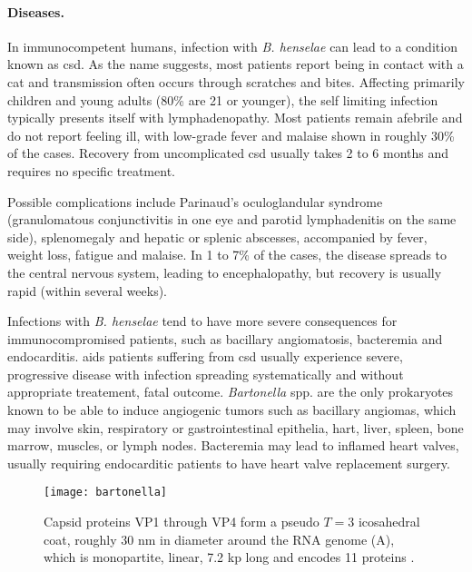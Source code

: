 \paragraph{Diseases.}
In immunocompetent humans, infection with \textit{B. henselae} can lead to a condition known as \gls{csd}. As the name suggests, most patients report being in contact with a cat and transmission often occurs through scratches and bites. Affecting primarily children and young adults (80\% are 21 or younger), the self limiting infection typically presents itself with lymphadenopathy. Most patients remain afebrile and do not report feeling ill, with low-grade fever and malaise shown in roughly 30\% of the cases. Recovery from uncomplicated \gls{csd} usually takes 2 to 6 months and requires no specific treatment.

Possible complications include Parinaud's oculoglandular syndrome (granulomatous conjunctivitis in one eye and parotid lymphadenitis on the same side), splenomegaly and hepatic or splenic abscesses, accompanied by fever, weight loss, fatigue and malaise. In 1 to 7\% of the cases, the disease spreads to the central nervous system, leading to encephalopathy, but recovery is usually rapid (within several weeks).

Infections with \textit{B. henselae} tend to have more severe consequences for immunocompromised patients, such as bacillary angiomatosis, bacteremia and endocarditis. \Gls{aids} patients suffering from \gls{csd} usually experience severe, progressive disease with infection spreading systematically and without appropriate treatement, fatal outcome. \textit{Bartonella} spp. are the only prokaryotes known to be able to induce angiogenic tumors such as bacillary angiomas, which may involve skin, respiratory or gastrointestinal epithelia, hart, liver, spleen, bone marrow, muscles, or lymph nodes. Bacteremia may lead to inflamed heart valves, usually requiring endocarditic patients to have heart valve replacement surgery.

\begin{figure}
  \centering
  \texttt{[image: bartonella]}
  \caption[Replication cycle of \textit{Vaccinia viruses} for both intracellular mature and extracellular enveloped virions.]{Capsid proteins VP1 through VP4 form a pseudo $T=3$ icosahedral coat, roughly 30 nm in diameter around the RNA genome (A), which is monopartite, linear, 7.2 kp long and encodes 11 proteins \citep{Harms2012}.}
  \label{fig:bartonella}
\end{figure}

